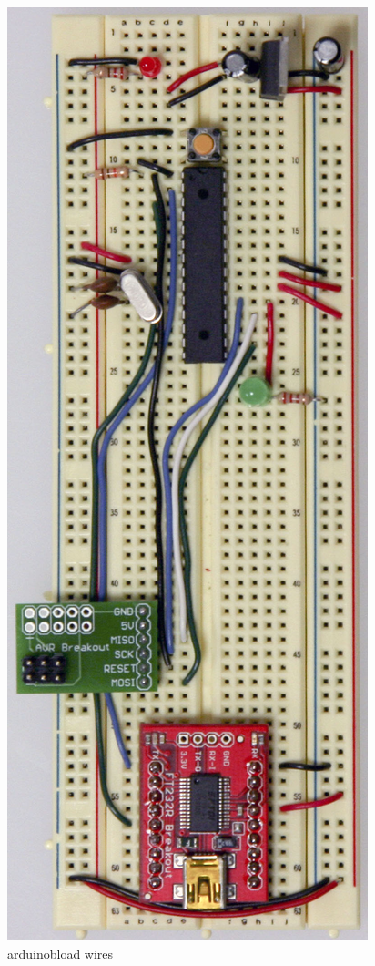 \begin{figure}[!htb]
 \centering
 \includegraphics[scale=0.3]{img/arduino_breadboard/arduinobload_wires.jpg}
 \caption{arduinobload wires}
 \label{arduinobload wires}
\end{figure}


